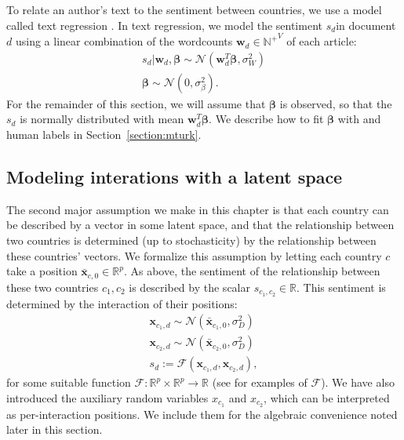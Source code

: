 To relate an author's text to the sentiment between countries, we use
a model called text regression \citep{kogan:2009}.  In text
regression, we model the sentiment $s_d$in document $d$ using a linear
combination of the wordcounts $\bm w_d \in \mathbb{N^+}^V$ of each
article:
\begin{align}
  s_d | \bm w_d, \bm \beta \sim \mathcal{N}( \bm w_d^T \bm \beta,
  \sigma_W^2 ) \nonumber \\
  \bm \beta \sim \mathcal{N}(0, \sigma_\beta^2 ).
  \label{eq:sentiment_text}
\end{align}
For the remainder of this section, we will assume that $\bm \beta$ is
observed, so that the $s_d$ is normally distributed with mean
$\bm w_d^T \bm \beta$.  We describe how to fit $\bm \beta$ with
 and human labels in
Section~\ref{section:mturk}.

\subsection{Modeling interations with a latent space}
\label{sec:fr_latent_space_model}
The second major assumption we make in this chapter is that each
country can be described by a vector in some latent space, and that
the relationship between two countries is determined (up to
stochasticity) by the relationship between these countries' vectors.
We formalize this assumption by letting each country $c$ take a
position $\bm \bar x_{c,0} \in \mathbb{R}^p$. As above, the sentiment
of the relationship between these two countries $c_1, c_2$ is
described by the scalar $s_{c_1,c_2} \in \mathbb{R}$.  This sentiment
is determined by the interaction of their positions:
\begin{align}
  \bm x_{c_1,d} \sim \mathcal{N}(\bm \bar x_{c_1, 0}, \sigma_D^2) \nonumber \\
  \bm x_{c_2,d} \sim \mathcal{N}(\bm \bar x_{c_2, 0}, \sigma_D^2) \nonumber \\
  s_d := \mathcal{F}(\bm x_{c_1,d}, \bm x_{c_2,d}), \label{eq:sentiment_space}
\end{align}
for some suitable function $\mathcal{F}: \mathbb{R}^p \times
\mathbb{R}^p \rightarrow \mathbb{R}$ (see 
for examples of $\mathcal{F}$).  We have also introduced the auxiliary
random variables $x_{c_1}$ and $x_{c_2}$, which can be interpreted as
per-interaction positions.  We include them for the algebraic
convenience noted later in this section.


